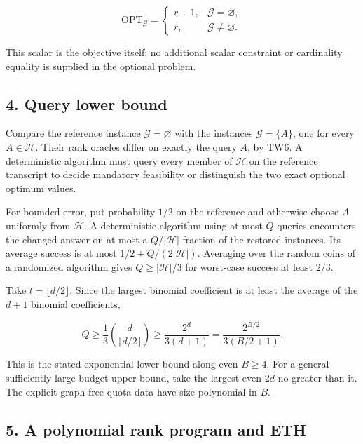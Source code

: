 \[
\mathrm{OPT}_{\mathcal G}=
\begin{cases}
r-1,&\mathcal G=\varnothing,\\
r,&\mathcal G\ne\varnothing.
\end{cases}
\tag{TW7}
\]

This scalar is the objective itself; no additional scalar constraint or cardinality equality is supplied in the optional problem.

\hypertarget{af-e9b108715f-query-lower-bound}{%
\subsection{4. Query lower bound}\label{af-e9b108715f-query-lower-bound}}

Compare the reference instance \(\mathcal G=\varnothing\) with the instances \(\mathcal G=\{A\}\), one for every \(A\in\mathcal H\). Their rank oracles differ on exactly the query \(A\), by TW6. A deterministic algorithm must query every member of \(\mathcal H\) on the reference transcript to decide mandatory feasibility or distinguish the two exact optional optimum values.

For bounded error, put probability \(1/2\) on the reference and otherwise choose \(A\) uniformly from \(\mathcal H\). A deterministic algorithm using at most \(Q\) queries encounters the changed answer on at most a \(Q/|\mathcal H|\) fraction of the restored instances. Its average success is at most \(1/2+Q/(2|\mathcal H|)\). Averaging over the random coins of a randomized algorithm gives \(Q\ge|\mathcal H|/3\) for worst-case success at least \(2/3\).

Take \(t=\lfloor d/2\rfloor\). Since the largest binomial coefficient is at least the average of the \(d+1\) binomial coefficients,

\[
Q\ge\frac13\binom d{\lfloor d/2\rfloor}
\ge\frac{2^d}{3(d+1)}
=\frac{2^{B/2}}{3(B/2+1)}.
\tag{TW8}
\]

This is the stated exponential lower bound along even \(B\ge4\). For a general sufficiently large budget upper bound, take the largest even \(2d\) no greater than it. The explicit graph-free quota data have size polynomial in \(B\).

\hypertarget{af-e9b108715f-a-polynomial-rank-program-and-eth}{%
\subsection{5. A polynomial rank program and ETH}\label{af-e9b108715f-a-polynomial-rank-program-and-eth}}

